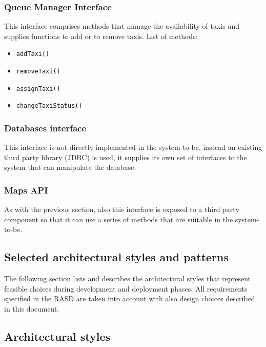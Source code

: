 \subsubsection{Queue Manager Interface}
This interface comprises methods that manage the availability of taxis and supplies functions to add or to remove taxis. \newline
List of methods:
\begin{itemize}
	\item \texttt{addTaxi()}
	\item \texttt{removeTaxi()}
	\item \texttt{assignTaxi()}
	\item \texttt{changeTaxiStatus()}
\end{itemize}
\subsubsection{Databases interface}
This interface is not directly implemented in the system-to-be, instead an existing third party library (JDBC) is used, it supplies its own set of interfaces to the system that can manipulate the database.
\subsubsection{Maps API}
As with the previous section, also this interface is exposed to a third party component so that it can use a series of methods that are suitable in the system-to-be.
\subsection{Selected architectural styles and patterns}
\label{sec:arch-styles-patterns}
The following section lists and describes the architectural styles that represent feasible choices during development and deployment phases. All requirements specified in the RASD are taken into account with also design choices described in this document. 
\subsection{Architectural styles}
